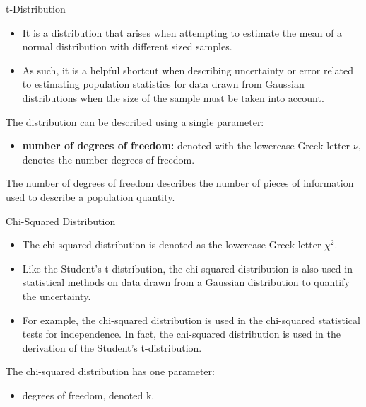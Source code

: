 \documentclass{beamer}
\begin{document}
\begin{frame}{t-Distribution}
	\begin{itemize}
		\item It is a distribution that arises when attempting to estimate the mean of a normal distribution with different sized samples. 
		\item As such, it is a helpful shortcut when describing uncertainty or error related to estimating population statistics for data drawn from Gaussian distributions when the size of the sample must be taken into account.
	\end{itemize}
	\justify
		The distribution can be described using a single parameter:
		\begin{itemize}
			\item \textbf{number of degrees of freedom:} denoted with the lowercase Greek letter $\nu$, denotes the number degrees of freedom.
		\end{itemize}
	\justify
		The number of degrees of freedom describes the number of pieces of information used to describe a population quantity.
	\end{frame}

\begin{frame}{Chi-Squared Distribution}
	\begin{itemize}
		\item The chi-squared distribution is denoted as the lowercase Greek letter $\chi^2$.
		\item Like the Student’s t-distribution, the chi-squared distribution is also used in statistical methods on data drawn from a Gaussian distribution to quantify the uncertainty.
		\item  For example, the chi-squared distribution is used in the chi-squared statistical tests for independence. In fact, the chi-squared distribution is used in the derivation of the Student’s t-distribution.
	\end{itemize}
	\justify
		The chi-squared distribution has one parameter:
		\begin{itemize}
			\item degrees of freedom, denoted k.
		\end{itemize}	
\end{frame}
\end{document}
